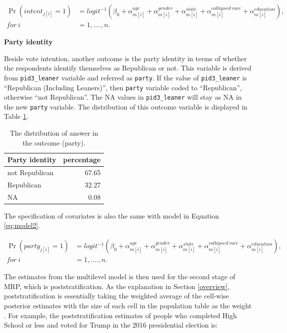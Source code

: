 \documentclass{monashthesis}
\begin{document}
\begin{equation} 
\begin{split}
\Pr(intent_{j[i]} = 1) &= logit^{-1}\left(\beta_0 + \alpha^{age}_{m[i]} + \alpha^{gender}_{m[i]} + \alpha^{state}_{m[i]} + \alpha^{collapsed\ race}_{m[i]} + \alpha^{education}_{m[i]}\right), \\
for\ i &= 1, ...., n.
\end{split}
\label{eq:model4a}
\end{equation}

\textbf{Party identity}

Beside vote intention, another outcome is the party identity in terms of whether the respondents identify themselves as Republican or not. This variable is derived from \texttt{pid3\_leaner} variable and referred as \texttt{party}. If the value of \texttt{pid3\_leaner} is ``Republican (Including Leaners)'', then \texttt{party} variable coded to ``Republican'', otherwise ``not Republican''. The NA values in \texttt{pid3\_leaner} will stay as NA in the new \texttt{party} variable. The distribution of this outcome variable is displayed in Table \ref{tab:party-dist}.

\begin{table}

\caption{\label{tab:party-dist}The distribution of answer in the outcome (party).}
\centering
\begin{tabular}[t]{lr}
\toprule
Party identity & percentage\\
\midrule
not Republican & 67.65\\
Republican & 32.27\\
NA & 0.08\\
\bottomrule
\end{tabular}
\end{table}

The specification of covariates is also the same with model in Equation \eqref{eq:model2}.

\begin{equation} 
\begin{split}
\Pr(party_{j[i]} = 1) &= logit^{-1}\left(\beta_0 + \alpha^{age}_{m[i]} + \alpha^{gender}_{m[i]} + \alpha^{state}_{m[i]} + \alpha^{collapsed\ race}_{m[i]} + \alpha^{education}_{m[i]}\right), \\
for\ i &= 1, ...., n.
\end{split}
\label{eq:model4b}
\end{equation}

The estimates from the multilevel model is then used for the second stage of MRP, which is poststratification. As the explanation in Section \ref{overview}, poststratification is essentially taking the weighted average of the cell-wise posterior estimates with the size of each cell in the population table as the weight \autocite{GaoYuxiang2021IMRa}. For example, the poststratification estimates of people who completed High School or less and voted for Trump in the 2016 presidential election is:
\end{document}
